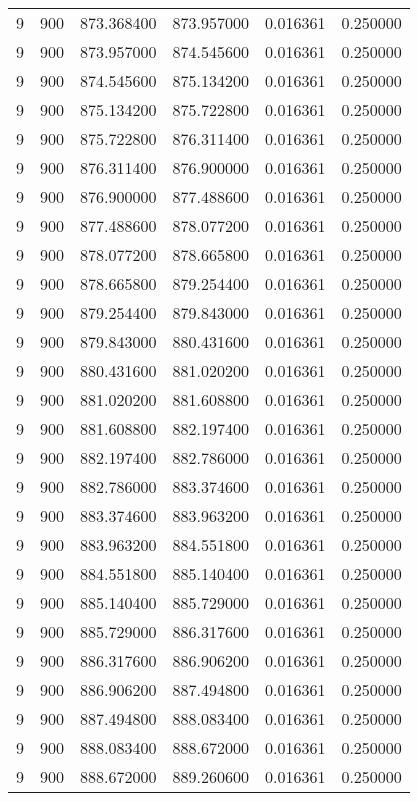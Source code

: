 \begin{longtable}{rrrrrr}
9 & 900 & 873.368400 & 873.957000 & 0.016361 & 0.250000 \\
9 & 900 & 873.957000 & 874.545600 & 0.016361 & 0.250000 \\
9 & 900 & 874.545600 & 875.134200 & 0.016361 & 0.250000 \\
9 & 900 & 875.134200 & 875.722800 & 0.016361 & 0.250000 \\
9 & 900 & 875.722800 & 876.311400 & 0.016361 & 0.250000 \\
9 & 900 & 876.311400 & 876.900000 & 0.016361 & 0.250000 \\
9 & 900 & 876.900000 & 877.488600 & 0.016361 & 0.250000 \\
9 & 900 & 877.488600 & 878.077200 & 0.016361 & 0.250000 \\
9 & 900 & 878.077200 & 878.665800 & 0.016361 & 0.250000 \\
9 & 900 & 878.665800 & 879.254400 & 0.016361 & 0.250000 \\
9 & 900 & 879.254400 & 879.843000 & 0.016361 & 0.250000 \\
9 & 900 & 879.843000 & 880.431600 & 0.016361 & 0.250000 \\
9 & 900 & 880.431600 & 881.020200 & 0.016361 & 0.250000 \\
9 & 900 & 881.020200 & 881.608800 & 0.016361 & 0.250000 \\
9 & 900 & 881.608800 & 882.197400 & 0.016361 & 0.250000 \\
9 & 900 & 882.197400 & 882.786000 & 0.016361 & 0.250000 \\
9 & 900 & 882.786000 & 883.374600 & 0.016361 & 0.250000 \\
9 & 900 & 883.374600 & 883.963200 & 0.016361 & 0.250000 \\
9 & 900 & 883.963200 & 884.551800 & 0.016361 & 0.250000 \\
9 & 900 & 884.551800 & 885.140400 & 0.016361 & 0.250000 \\
9 & 900 & 885.140400 & 885.729000 & 0.016361 & 0.250000 \\
9 & 900 & 885.729000 & 886.317600 & 0.016361 & 0.250000 \\
9 & 900 & 886.317600 & 886.906200 & 0.016361 & 0.250000 \\
9 & 900 & 886.906200 & 887.494800 & 0.016361 & 0.250000 \\
9 & 900 & 887.494800 & 888.083400 & 0.016361 & 0.250000 \\
9 & 900 & 888.083400 & 888.672000 & 0.016361 & 0.250000 \\
9 & 900 & 888.672000 & 889.260600 & 0.016361 & 0.250000 \\

\end{longtable}
